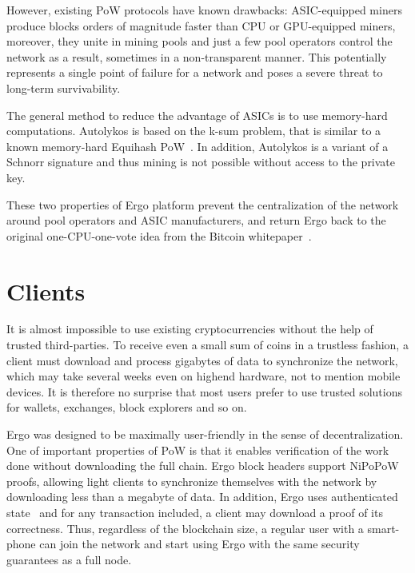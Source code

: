 \documentclass[]{article}
\begin{document}
    However, existing PoW protocols have known drawbacks: ASIC-equipped miners produce
    blocks orders of magnitude faster than CPU or GPU-equipped miners, moreover, they unite in
    mining pools and just a few pool operators control the network as a result, sometimes in a non-transparent
    manner. This potentially represents a single point of failure for a network and poses
    a severe threat to long-term survivability.

    The general method to reduce the advantage of ASICs is to use memory-hard computations.
    Autolykos is based on the k-sum problem, that is similar to a known memory-hard Equihash
    PoW~\cite{biryukov2017equihash}. In addition, Autolykos is a variant of a Schnorr signature and thus mining is not
    possible without access to the private key.

    These two properties of Ergo platform prevent the centralization of the network around pool
    operators and ASIC manufacturers, and return Ergo back to the original one-CPU-one-vote idea
    from the Bitcoin whitepaper~\cite{nakamoto2008bitcoin}.

    \section{Clients}

    It is almost impossible to use existing cryptocurrencies without the help of trusted third-parties.
    To receive even a small sum of coins in a trustless fashion, a client must download and process
    gigabytes of data to synchronize the network, which may take several weeks even on highend
    hardware, not to mention mobile devices. It is therefore no surprise that most users prefer
    to use trusted solutions for wallets, exchanges, block explorers and so on.

    Ergo was designed to be maximally user-friendly in the sense of decentralization. One of
    important properties of PoW is that it enables verification of the work done without downloading
    the full chain. Ergo block headers support NiPoPoW~\cite{kiayias2017non} proofs, allowing light clients to
    synchronize themselves with the network by downloading less than a megabyte of data. In addition, Ergo uses
    authenticated state~\cite{reyzin2017improving} and for any transaction included, a client may download a proof of its
    correctness. Thus, regardless of the blockchain size, a regular user with a smart-phone can join
    the network and start using Ergo with the same security guarantees as a full node.
\end{document}
